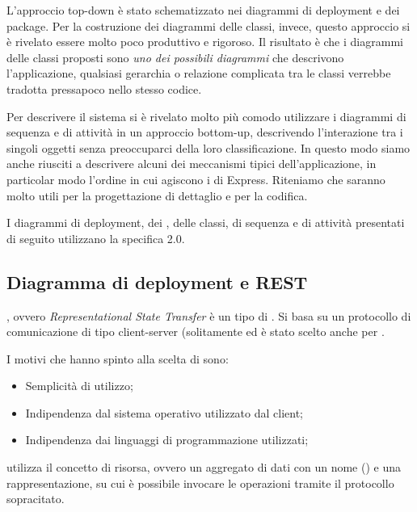 L'approccio top-down è stato schematizzato nei diagrammi di deployment e dei package. Per la costruzione dei diagrammi delle classi, invece, questo approccio si è rivelato essere molto poco produttivo e rigoroso. Il risultato è che i diagrammi delle classi proposti sono \emph{uno dei possibili diagrammi} che descrivono l'applicazione, qualsiasi gerarchia o relazione complicata tra le classi verrebbe tradotta pressapoco nello stesso codice.

Per descrivere il sistema si è rivelato molto più comodo utilizzare i diagrammi di sequenza e di attività in un approccio bottom-up, descrivendo l'interazione tra i singoli oggetti senza preoccuparci della loro classificazione. In questo modo siamo anche riusciti a descrivere alcuni dei meccanismi tipici dell'applicazione, in particolar modo l'ordine in cui agiscono i  di Express. Riteniamo che saranno molto utili per la progettazione di dettaglio e per la codifica.

I diagrammi di deployment, dei , delle classi, di sequenza e di attività presentati di seguito utilizzano la specifica  2.0.

\subsection{Diagramma di deployment e REST}
, ovvero \textit{Representational State Transfer} è un tipo di . Si basa su un protocollo di comunicazione  di tipo client-server (solitamente  ed è stato scelto anche per \ProjectName{}.

I motivi che hanno spinto alla scelta di  sono:
\begin{itemize}
\item Semplicità di utilizzo;
\item Indipendenza dal sistema operativo utilizzato dal client;
\item Indipendenza dai linguaggi di programmazione utilizzati;
\end{itemize}

 utilizza il concetto di risorsa, ovvero un aggregato di dati con un nome () e una rappresentazione, su cui è possibile invocare le operazioni  tramite il protocollo sopracitato.

